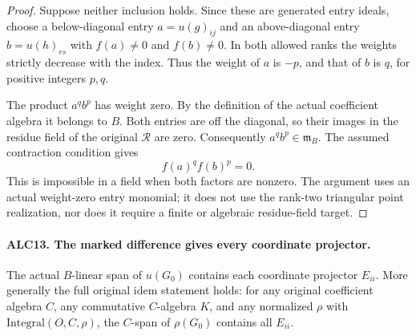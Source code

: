 \begin{proof}
Suppose neither inclusion holds.  Since these are generated
entry ideals, choose a below-diagonal entry \(a=u(g)_{ij}\)
and an above-diagonal entry \(b=u(h)_{rs}\) with
\(f(a)\ne0\) and \(f(b)\ne0\).  In both allowed ranks
the weights strictly decrease with the index.  Thus the
weight of \(a\) is \(-p\), and that of \(b\) is \(q\),
for positive integers \(p,q\).

The product \(a^qb^p\) has weight zero.  By the definition
of the actual coefficient algebra it belongs to \(B\).
Both entries are off the diagonal, so their images in the
residue field of the original \(\mathcal R\) are zero.
Consequently \(a^qb^p\in\mathfrak m_B\).  The assumed
contraction condition gives
\[
                       f(a)^q f(b)^p=0.
\]
This is impossible in a field when both factors are nonzero.
The argument uses an actual weight-zero entry monomial; it
does not use the rank-two triangular point realization, nor
does it require a finite or algebraic residue-field target.
\end{proof}

\paragraph{ALC13. The marked difference gives every coordinate projector.}
\label{claim:ALC13}
The actual \(B\)-linear span of \(u(G_0)\) contains each
coordinate projector \(E_{ii}\).  More generally the full
original \(\mathrm{idem}\) statement holds: for any original
coefficient algebra \(C\), any commutative \(C\)-algebra
\(K\), and any normalized \(\rho\) with
\(\mathrm{Integral}(O,C,\rho)\), the \(C\)-span of
\(\rho(G_0)\) contains all \(E_{ii}\).

